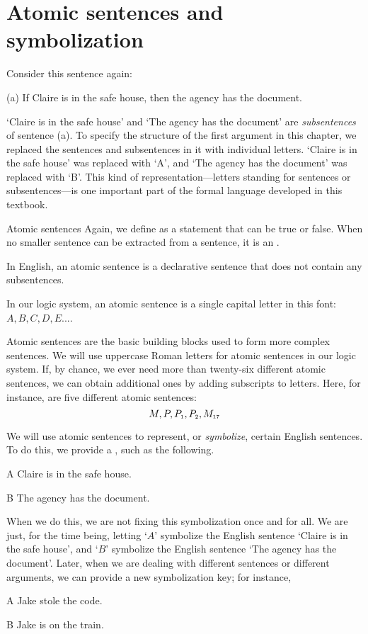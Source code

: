 \filbreak

\section{Atomic sentences and symbolization}\label{s:atomic}

Consider this sentence again:
	\begin{earg}
		\item[(a)] If Claire is in the safe house, then the agency has the document.
	\end{earg}
`Claire is in the safe house' and `The agency has the document' are \textit{subsentences} of sentence (a). To specify the structure of the first argument in this chapter, we replaced the sentences and subsentences in it with individual letters. `Claire is in the safe house' was replaced with `A', and `The agency has the document' was replaced with `B'. This kind of representation---letters standing for sentences or subsentences---is one important part of the formal language developed in this textbook.

\begin{factboxy}{Atomic sentences}
Again, we define  as a statement that can be true or false. When no smaller sentence can be extracted from a sentence, it is an .\medskip

In English, an atomic sentence is a declarative sentence that does not contain any subsentences.\smallskip

In our logic system, an atomic sentence is a single capital letter in this font: $A, B, C, D, E . . .$.
\end{factboxy}

Atomic sentences are the basic building blocks used to form more complex sentences. We will use uppercase Roman letters for atomic sentences in our logic system. If, by chance, we ever need more than twenty-six different atomic sentences, we can obtain additional ones by adding subscripts to letters. Here, for instance, are five different atomic sentences:
	$$M, P, P_{\text{\tiny 1}}, P_{\text{\tiny 2}}, M_{\text{\tiny 17}}$$

We will use atomic sentences to represent, or \emph{symbolize}, certain English sentences. To do this, we provide a , such as the following.
	\begin{ekey}
		\item[A] Claire is in the safe house.
		\item[B] The agency has the document.
	\end{ekey}
When we do this, we are not fixing this symbolization once and for all. We are just, for the time being, letting `$A$' symbolize the English sentence `Claire is in the safe house', and `$B$' symbolize the English sentence `The agency has the document'. Later, when we are dealing with different sentences or different arguments, we can provide a new symbolization key; for instance, 
	\begin{ekey}
		\item[A] Jake stole the code.
		\item[B] Jake is on the train.
	\end{ekey}



